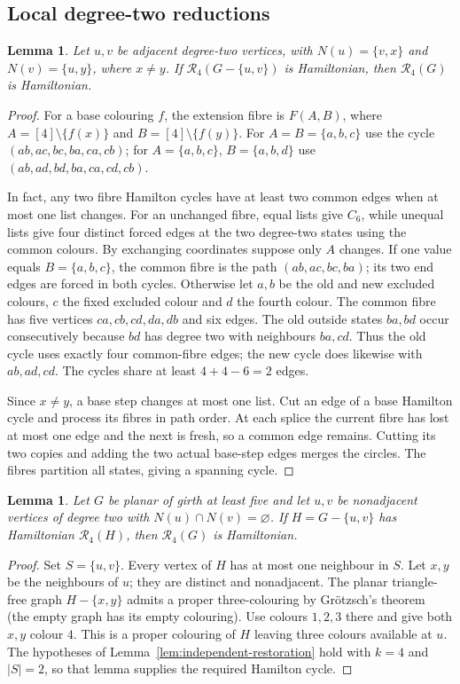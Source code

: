 \documentclass[11pt]{article}
\newtheorem{lemma}[theorem]{Lemma}
\theoremstyle{remark}
\newcommand{\R}{\mathcal R}
\numberwithin{equation}{section}
\numberwithin{table}{section}
\begin{document}
\subsection{Local degree-two reductions}
\begin{lemma}
\label{lem:adjacent-two-four}
Let $u,v$ be adjacent degree-two vertices, with
$N(u)=\{v,x\}$ and $N(v)=\{u,y\}$, where $x\ne y$.  If
$\R_4(G-\{u,v\})$ is Hamiltonian, then $\R_4(G)$ is Hamiltonian.
\end{lemma}
\begin{proof}
For a base colouring $f$, the extension fibre is $F(A,B)$, where
$A=[4]\setminus\{f(x)\}$ and $B=[4]\setminus\{f(y)\}$.
For $A=B=\{a,b,c\}$ use the cycle $(ab,ac,bc,ba,ca,cb)$;
for $A=\{a,b,c\}$, $B=\{a,b,d\}$ use
$(ab,ad,bd,ba,ca,cd,cb)$.

In fact, any two fibre Hamilton cycles have at least two common
edges when at most one list changes. For an unchanged fibre, equal
lists give $C_6$, while unequal lists give four distinct forced
edges at the two degree-two states using the common colours.
By exchanging coordinates suppose only $A$ changes. If one value
equals $B=\{a,b,c\}$, the common fibre is the path
$(ab,ac,bc,ba)$; its two end edges are forced in both cycles.
Otherwise let $a,b$ be the old and new excluded colours, $c$ the
fixed excluded colour and $d$ the fourth colour. The common fibre
has five vertices $ca,cb,cd,da,db$ and six edges. The old outside
states $ba,bd$ occur consecutively because $bd$ has degree two
with neighbours $ba,cd$. Thus the old cycle uses exactly four
common-fibre edges; the new cycle does likewise with $ab,ad,cd$.
The cycles share at least $4+4-6=2$ edges.

Since $x\ne y$, a base step changes at most one list. Cut an edge
of a base Hamilton cycle and process its fibres in path order.
At each splice the current fibre has lost at most one edge and the
next is fresh, so a common edge remains. Cutting its two copies
and adding the two actual base-step edges merges the circles.
The fibres partition all states, giving a spanning cycle.
\end{proof}

\begin{lemma}\label{lem:separated-two-g5}
Let $G$ be planar of girth at least five and let $u,v$ be nonadjacent
vertices of degree two with $N(u)\cap N(v)=\varnothing$.  If
$H=G-\{u,v\}$ has Hamiltonian $\R_4(H)$, then $\R_4(G)$ is Hamiltonian.
\end{lemma}
\begin{proof}
Set $S=\{u,v\}$.  Every vertex of $H$ has at most one neighbour in $S$.
Let $x,y$ be the neighbours of $u$; they are distinct and nonadjacent.
The planar triangle-free graph $H-\{x,y\}$ admits a proper three-colouring
by Gr\"otzsch's theorem~\cite{Grotzsch59} (the empty graph has its empty
colouring).  Use colours $1,2,3$ there and give both $x,y$ colour $4$.
This is a proper colouring of $H$ leaving three colours available at $u$.
The hypotheses of Lemma~\ref{lem:independent-restoration} hold with
$k=4$ and $|S|=2$, so that lemma supplies the required Hamilton cycle.
\end{proof}
\end{document}
